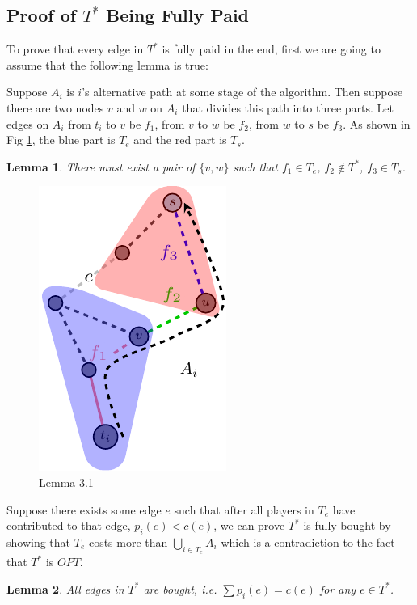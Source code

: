 \documentclass[11pt,psfig,times]{article}
\newtheorem{lemma}{Lemma}[section]
\begin{document}
\subsection{Proof of $T^*$ Being Fully Paid}

To prove that every edge in \(T^*\) is fully paid in the end, first we are going to assume that the following lemma is true:

Suppose \(A_i\) is \(i\)'s alternative path at some stage of the algorithm. Then suppose there are two nodes \(v\) and \(w\) on \(A_i\) that divides this path into three parts. Let edges on \(A_i\) from \(t_i\) to \(v\) be \(f_1\), from \(v\) to \(w\) be \(f_2\), from \(w\) to \(s\) be \(f_3\). As shown in Fig \ref{fig:lemma3.1}, the blue part is $T_e$ and the red part is $T_s$. 
	\begin{lemma}
		There must exist a pair of \(\{v,w\}\) such that \(f_1 \in T_e\), \(f_2 \notin T^*\), \(f_3 \in T_s\).
	\end{lemma}

\begin{figure}[H]
\begin{center}
	\includegraphics{pictures/lemma3.1.pdf}
	\end{center}
	\caption{Lemma 3.1}
	\label{fig:lemma3.1}
\end{figure}

Suppose there exists some edge \(e\) such that after all players in \(T_e\) have contributed to that edge, \(p_i(e) < c(e)\), we can prove $T^*$ is fully bought by showing that \(T_e\) costs more than \(\bigcup_{i\in T_e} A_i\) which is a contradiction to the fact that \(T^*\) is \(OPT\).

	\begin{lemma}
		All edges in \(T^*\) are bought, i.e. $\sum p_i(e) = c(e)$ for any $e \in T^*$.
	\end{lemma}
	
\end{document}
